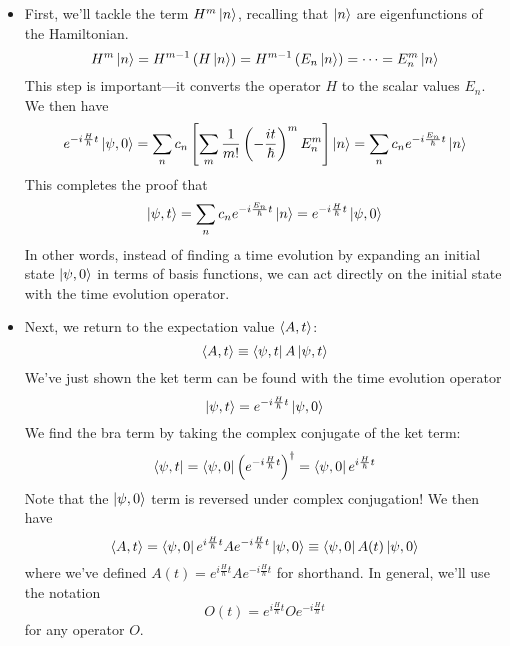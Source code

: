 \documentclass[11pt, a4paper]{article}
\newcommand{\tev}{e^{-i\frac{H}{\hbar}t}}  %
\newcommand{\tevp}{e^{i\frac{H}{\hbar}t}}  %
\begin{document}
\begin{itemize}
	\item First, we'll tackle the term $ H^{m}\ket{n} $, recalling that $ \ket{n} $ are eigenfunctions of the Hamiltonian.
	\begin{equation*}
		H^{m}\ket{n} = H^{m-1}\left(H\ket{n}\right) = H^{m-1}\left(E_{n}\ket{n}\right) = \cdots = E_{n}^{m}\ket{n}
	\end{equation*}
	This step is important---it converts the operator $ H $ to the scalar values $ E_{n} $. We then have
	\begin{equation*}
		e^{-i\frac{H}{\hbar}t}\ket{\psi, 0} = \sum_{n}c_{n} \left[\sum_{m}\frac{1}{m!}\left (-\frac{it}{\hbar}\right )^{m}E_{n}^{m}\right]\ket{n} = \sum_{n}c_{n}e^{-i\frac{E_{n}}{\hbar}t}\ket{n}
	\end{equation*}
	This completes the proof that
	\begin{equation*}
		\ket{\psi, t} = \sum_{n} c_{n}e^{-i \frac{E_{n}}{\hbar}t}\ket{n} = e^{-i\frac{H}{\hbar}t}\ket{\psi, 0}
	\end{equation*} 
	In other words, instead of finding a time evolution by expanding an initial state $ \ket{\psi, 0} $ in terms of basis functions, we can act directly on the initial state with the time evolution operator.
	
	\item Next, we return to the expectation value $ \ev{A, t} $:
	\begin{equation*}
		\ev{A, t} \equiv \bra{\psi, t} A \ket{\psi, t}
	\end{equation*}
	We've just shown the ket term can be found with the time evolution operator
	\begin{equation*}
		\ket{\psi, t} = \tev \ket{\psi, 0}
	\end{equation*}
	We find the bra term by taking the complex conjugate of the ket term:
	\begin{equation*}
		\bra{\psi, t} = \bra{\psi, 0}\left(\tev\right)^{\dagger} = \bra{\psi, 0}\tevp
	\end{equation*}
	Note that the $ \ket{\psi, 0} $ term is reversed under complex conjugation! We then have
	\begin{equation*}
		\ev{A, t} = \bra{\psi, 0}\tevp A \tev \ket{\psi, 0} \equiv  \bra{\psi, 0} A(t) \ket{\psi, 0}
	\end{equation*}
	where we've defined $ A(t) = \tevp A \tev  $ for shorthand. In general, we'll use the notation
	\begin{equation*}
		O(t) = \tevp O \tev
	\end{equation*}
	for any operator $ O $. 
	

\end{itemize}
\end{document}
